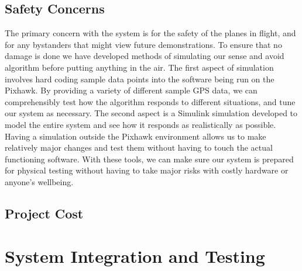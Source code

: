 \documentclass[12pt]{article}
\begin{document}
\subsection{Safety Concerns}
The primary concern with the system is for the safety of the planes in flight, and for any bystanders that might view future demonstrations. To ensure that no damage is done we have developed methods of simulating our sense and avoid algorithm before putting anything in the air. The first aspect of simulation involves hard coding sample data points into the software being run on the Pixhawk. By providing a variety of different sample GPS data, we can comprehensibly test how the algorithm responds to different situations, and tune our system as necessary. The second aspect is a Simulink simulation developed to model the entire system and see how it responds as realistically as possible. Having a simulation outside the Pixhawk environment allows us to make relatively major changes and test them without having to touch the actual functioning software. With these tools, we can make sure our system is prepared for physical testing without having to take major risks with costly hardware or anyone's wellbeing.

\subsection{Project Cost}

\section{System Integration and Testing}
\end{document}
